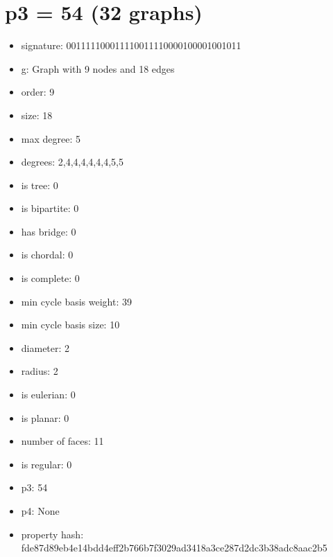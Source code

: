\chapter{p3 = 54 (32 graphs)}
\newpage\begin{figure}
\end{figure}
\begin{itemize}
\item signature: 001111100011110011110000100001001011
\item g: Graph with 9 nodes and 18 edges
\item order: 9
\item size: 18
\item max degree: 5
\item degrees: 2,4,4,4,4,4,4,5,5
\item is tree: 0
\item is bipartite: 0
\item has bridge: 0
\item is chordal: 0
\item is complete: 0
\item min cycle basis weight: 39
\item min cycle basis size: 10
\item diameter: 2
\item radius: 2
\item is eulerian: 0
\item is planar: 0
\item number of faces: 11
\item is regular: 0
\item p3: 54
\item p4: None
\item property hash: fde87d89eb4e14bdd4eff2b766b7f3029ad3418a3ce287d2dc3b38adc8aac2b5
\end{itemize}
